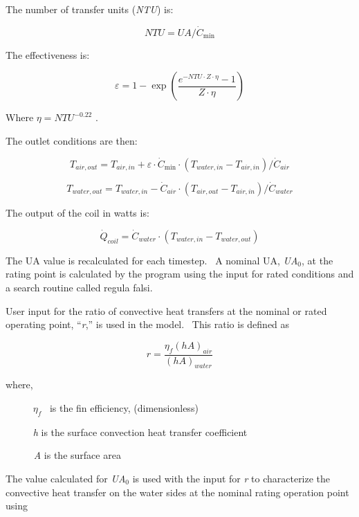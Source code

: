 The number of transfer units (\emph{NTU}) is:

\begin{equation}
NTU = UA/{\dot C_{\min }}
\end{equation}

The effectiveness is:

\begin{equation}
\varepsilon  = 1 - \exp (\frac{{{e^{ - NTU \cdot Z \cdot \eta }} - 1}}{{Z \cdot \eta }})
\end{equation}

Where \(\eta = NT{U^{ - 0.22}}\) .

The outlet conditions are then:

\begin{equation}
{T_{air,out}} = {T_{air,in}} + \varepsilon \cdot {\dot C_{\min }}\cdot ({T_{water,in}} - {T_{air,in}})/{\dot C_{air}}
\end{equation}

\begin{equation}
{T_{water,out}} = {T_{water,in}} - {\dot C_{air}}\cdot ({T_{air,out}} - {T_{air,in}})/{\dot C_{water}}
\end{equation}

The output of the coil in watts is:

\begin{equation}
{\dot Q_{coil}} = {\dot C_{water}}\cdot ({T_{water,in}} - {T_{water,out}})
\end{equation}

The UA value is recalculated for each timestep.~ A nominal UA, \emph{UA\(_{0}\)}, at the rating point is calculated by the program using the input for rated conditions and a search routine called regula falsi.

User input for the ratio of convective heat transfers at the nominal or rated operating point, ``\emph{r},'' is used in the model.~ This ratio is defined as

\begin{equation}
r = \frac{{{\eta_f}{{\left( {hA} \right)}_{air}}}}{{{{\left( {hA} \right)}_{water}}}}
\end{equation}

where,

~~~~~ \({\eta_f}\) ~is the fin efficiency, (dimensionless)

~~~~~ \emph{h} is the surface convection heat transfer coefficient

\emph{~~~~~ A} is the surface area

The value calculated for \emph{UA}\(_{0}\) is used with the input for \emph{r} to characterize the convective heat transfer on the water sides at the nominal rating operation point using

